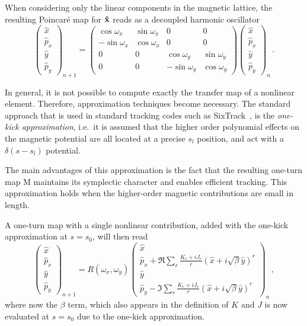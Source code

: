 When considering only the linear components in the magnetic lattice, the resulting Poincaré map for $\vb{\hat x}$ reads as a decoupled harmonic oscillator
%
\begin{equation} 
	\begin{pmatrix}
		\hat x \\ \hat p_x \\ \hat y \\ \hat p_y 
	\end{pmatrix}_{n+1}
	=
	\begin{pmatrix}
		\cos\omega_x & \sin\omega_x & 0 & 0 \\
		-\sin\omega_x & \cos\omega_x & 0 & 0 \\
		0 & 0 &\cos\omega_y & \sin\omega_y \\
		0 & 0 &-\sin\omega_y & \cos\omega_y
	\end{pmatrix}
	\begin{pmatrix}
		\hat x \\ \hat p_x \\ \hat y \\ \hat p_y 
	\end{pmatrix}_{n}\,.
\end{equation}

In general, it is not possible to compute exactly the transfer map of a nonlinear element. Therefore, approximation techniques become necessary. The standard approach that is used in standard tracking codes such as SixTrack~\cite{sixtrack}, is the \textit{one-kick approximation}, i.e.\ it is assumed that the higher order polynomial effects on the magnetic potential are all located at a precise $s_l$ position, and act with a $\delta(s - s_l)$ potential.

The main advantages of this approximation is the fact that the resulting one-turn map $\mathrm{M}$ maintains its symplectic character and enables efficient tracking. This approximation holds when the higher-order magnetic contributions are small in length.

A one-turn map with a single nonlinear contribution, added 
with the one-kick approximation at $s = s_0$, will then read  
\begin{equation}
	\begin{pmatrix}
		\hat x \\ \hat p_x \\ \hat y \\ \hat p_y 
	\end{pmatrix}_{n+1}
	=
	R(\omega_x,\omega_y)
	\begin{pmatrix}
		\hat x \\ \hat p_x + \Re \sum_r\frac{K_r + iJ_r}{r}(\hat x+ i\sqrt{\beta}\hat y)^r \\ \hat y \\ \hat p_y - \Im \sum_r\frac{K_r + iJ_r}{r}(\hat x+ i\sqrt{\beta}\hat y)^r  
	\end{pmatrix}_{n}\,,
\end{equation}
where now the $\beta$ term, which also appears in the definition of $K$ and $J$ is now evaluated at $s=s_0$ due to the one-kick approximation.

